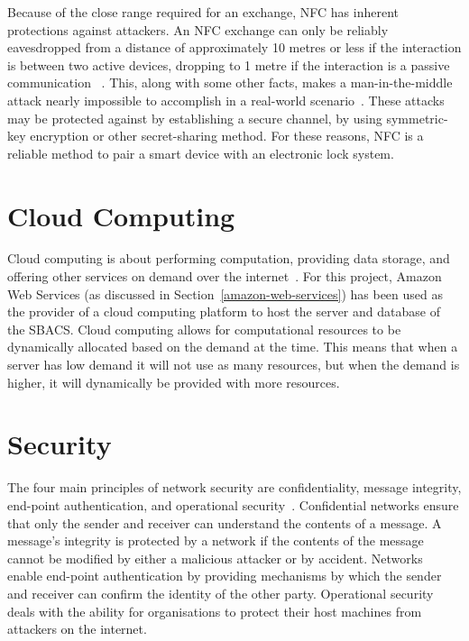 \documentclass[12pt]{report}
\let\Oldsection\section
\renewcommand{\section}{\FloatBarrier\Oldsection}
\begin{document}
Because of the close range required for an exchange, NFC has inherent protections against attackers. An NFC exchange
can only be reliably eavesdropped from a distance of approximately 10 metres or less if the interaction is between two 
active devices, dropping to 1 metre if the interaction is a passive communication ~\autocite{NFCSECURITY}. This, along 
with some other facts, makes a man-in-the-middle attack nearly impossible to accomplish in a real-world 
scenario~\autocite{NFCSECURITY}. These attacks may be protected against by establishing a secure channel, by using 
symmetric-key encryption or other secret-sharing method. For these reasons, NFC is a reliable method to pair a smart 
device with an electronic lock system.


\section{Cloud Computing} \label{cloud-computing}

Cloud computing is about performing computation, providing data storage, and offering other services
on demand over the internet~\autocite{CLOUDCOMPUTING}. For this project, Amazon Web Services (as discussed
in Section~\ref{amazon-web-services})
has been used as the provider of a cloud computing platform to host the server and database of the SBACS.
Cloud computing allows for computational resources to be dynamically allocated based on the demand
at the time. This means that when a server has low demand it will not use as many resources, but when
the demand is higher, it will dynamically be provided with more resources.


\section{Security} \label{security}

The four main principles of network security are confidentiality, message integrity, end-point authentication, and
operational security~\autocite{NETWORKTEXTBOOK}. Confidential networks ensure that only the sender and receiver can
understand the contents of a message. A message's integrity is protected by a network if the contents of the message
cannot be modified by either a malicious attacker or by accident. Networks enable end-point authentication by providing
mechanisms by which the sender and receiver can confirm the identity of the other party. Operational security deals with
the ability for organisations to protect their host machines from attackers on the internet.
\end{document}
